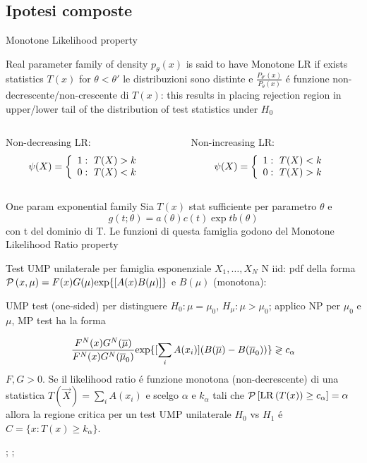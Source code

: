 \documentclass[asd-beamer.tex]{subfiles}
\begin{document}
\subsection{Ipotesi composte}

\begin{frame}{Monotone Likelihood property}\frameintoc
\begin{block}{}
Real parameter family of density $p_{\theta}(x)$ is said to have Monotone LR if exists statistics $T(x)$ for $\theta<\theta'$ le distribuzioni sono distinte e $\frac{P_{\theta'}(x)}{P_{\theta}(x)}$ \'e funzione non-decrescente/non-crescente di $T(x)$: this results in placing rejection region in upper/lower tail of the distribution of test statistics under $H_0$
\begin{columns}[T]
	\begin{column}{0.5\textwidth}
		Non-decreasing LR:
		\begin{align*}
		&\psi(X)=\left\{\begin{array}{l}1:\ T(X)>k\\0:\ T(X)<k\\ \end{array}\right.
		\end{align*}
	\end{column}
	\begin{column}{0.5\textwidth}
		Non-increasing LR:
		\begin{align*}
		&\psi(X)=\left\{\begin{array}{l}1:\ T(X)<k\\0:\ T(X)>k\\ \end{array}\right.
		\end{align*}
	\end{column}
\end{columns}
\end{block}
\begin{block}{One param exponential family}
Sia $T(x)$ stat sufficiente per parametro $\theta$ e 
\begin{equation*}
g(t;\theta)=a(\theta)c(t)\exp{tb(\theta)}
\end{equation*}
con t del dominio di T. Le funzioni di questa famiglia godono del Monotone Likelihood Ratio property
\end{block}
\end{frame}

\begin{frame}{Test UMP unilaterale per famiglia esponenziale}
$X_1,\ldots,X_N$ N iid: pdf della forma $\operatorname{\mathcal{P}}{(x,\mu)}=F(x)G(\mu)\text{exp}\{[A(x)B(\mu)]\}$ e $B(\mu)$ (monotona):

UMP test (one-sided) per distinguere $H_0: \mu=\mu_0$, $H_{\mu}: \mu>\mu_0$; applico NP per $\mu_0$ e $\mu$, MP test ha la forma

\[\frac{F^N(x)G^N(\overline{\mu})}{F^N(x)G^N(\overline{\mu}_0)}\text{exp}\{[\sum_iA(x_i)](B(\overline{\mu})-B(\overline{\mu}_0))\}\gtrless c_{\alpha}\]
$F,G>0$.
Se il likelihood ratio \'e funzione monotona (non-decrescente) di una statistica $T(\vec{X})=\sum_iA(x_i)$ e scelgo $\alpha$ e $k_{\alpha}$ tali che $\operatorname{\mathcal{P}}{[\operatorname{LR}{(T(x))}\geq c_{\alpha}]}=\alpha$  allora la regione critica per un test UMP unilaterale $H_0$ vs $H_1$ \'e $C=\{x:T(x)\geq k_{\alpha}\}$.

\cite[5]{lrtmptumpt}; \cite[445]{inferencemukhopadhyay2000}; \cite[sec 3.6]{lehmann2006testing}
\end{frame}
\end{document}
